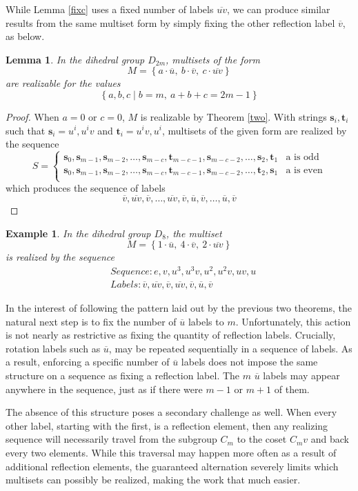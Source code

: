 \documentclass[12pt]{article}
\newtheorem{lem}[thm]{Lemma}
\newtheorem{exa}[thm]{Example}
\newcommand{\ba}{\[\begin{aligned}}
\newcommand{\ea}{\end{aligned}\]}
\newcommand{\setof}[1]{\left\{#1\right\}}
\newcommand{\setdef}[2]{\left\{#1\mid#2\right\}}
\newcommand{\ol}[1]{\overline{#1}} %
\newcommand{\bo}[1]{\textbf{#1}}%
\begin{document}
While Lemma \ref{fixc} uses a fixed number of labels $\ol{uv}$, we can produce similar results
from the same multiset form by simply fixing the other reflection label $\ol{v}$, as below.

\begin{lem} \label{fixb} In the dihedral group $D_{2m}$, multisets of the form
$$M = \setof{a \cdot \ol{u},\ b \cdot \ol{v},\ c \cdot \ol{uv}}$$
are realizable for the values
$$\setdef{a, b, c}{b = m,\ a + b + c = 2m - 1}$$
\end{lem}
\begin{proof}
  When $a = 0$ or $c=0$, $M$ is realizable by Theorem \ref{two}.
  With strings $\bo{s}_i, \bo{t}_i$ such that $\bo{s}_i = u^i, u^iv$ and
  $\bo{t}_i = u^iv, u^i$, multisets of the given form are realized by the sequence
  $$
  S = \begin{cases}
    \bo{s}_0, \bo{s}_{m-1}, \bo{s}_{m-2}, \dots, \bo{s}_{m-c}, \bo{t}_{m-c-1}, \bo{s}_{m-c-2}, \dots, \bo{s}_2, \bo{t}_1 & \text{a is odd}\\
    \bo{s}_0, \bo{s}_{m-1}, \bo{s}_{m-2}, \dots, \bo{s}_{m-c}, \bo{t}_{m-c-1}, \bo{s}_{m-c-2}, \dots, \bo{t}_2, \bo{s}_1 & \text{a is even}\\
  \end{cases}
  $$
  which produces the sequence of labels
  $$\ol{v}, \ol{uv}, \ol{v}, \dots, \ol{uv}, \ol{v}, \ol{u}, \ol{v}, \dots, \ol{u}, \ol{v}$$
\end{proof}
\begin{exa}
  In the dihedral group $D_{8}$, the multiset
  $$M = \setof{1 \cdot \ol{u},\ 4 \cdot \ol{v},\ 2 \cdot \ol{uv}}$$
  is realized by the sequence
  \ba
  &Sequence : e, v, u^3, u^3v, u^2, u^2v, uv, u\\
  &Labels : \ol{v}, \ol{uv}, \ol{v}, \ol{uv}, \ol{v}, \ol{u}, \ol{v}
  \ea
\end{exa}

In the interest of following the pattern laid out by the previous two theorems, the natural
next step is to fix the number of $\ol{u}$ labels to $m$. Unfortunately, this action
is not nearly as restrictive as fixing the quantity of reflection labels. Crucially,
rotation labels such as $\ol{u}$, may be repeated sequentially in a sequence of labels.
As a result, enforcing a specific number of $\ol{u}$ labels does not impose the same
structure on a sequence as fixing a reflection label. The $m$ $\ol{u}$ labels may appear
anywhere in the sequence, just as if there were $m-1$ or $m+1$ of them.

The absence of this structure poses a secondary challenge as well. When every other label,
starting with the first, is a reflection element, then any realizing sequence will necessarily
travel from the subgroup $C_m$ to the coset $C_mv$ and back every two elements. While this
traversal may happen more often as a result of additional reflection elements, the guaranteed
alternation severely limits which multisets can possibly be realized, making the work
that much easier.
\end{document}
